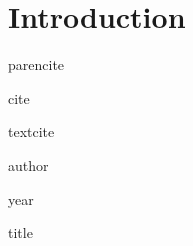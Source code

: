 
\chapter{Introduction} %

\label{Chapter1} 

parencite\parencite{fraislCitizenScienceEnvironmental2022}

cite \cite{fraislCitizenScienceEnvironmental2022}

textcite \textcite{fraislCitizenScienceEnvironmental2022}

author \citeauthor{fraislCitizenScienceEnvironmental2022}

year \citeyear{fraislCitizenScienceEnvironmental2022}

title 


